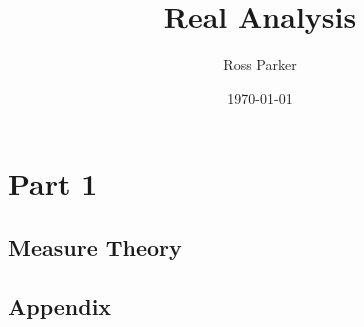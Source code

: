 \documentclass[mytheorems]{SIAMbook2019}
\title{Real Analysis}
\author{Ross Parker}
\date{\today}
\theoremstyle{plain}
\theoremstyle{definition}
\begin{document}
\maketitle
\frontmatter
\tableofcontents




\mainmatter
\part{Part 1}

\chapter[Measure Theory]%
{Measure Theory}




\appendix
\chapter[Appendix]%
{Appendix}





\end{document}
